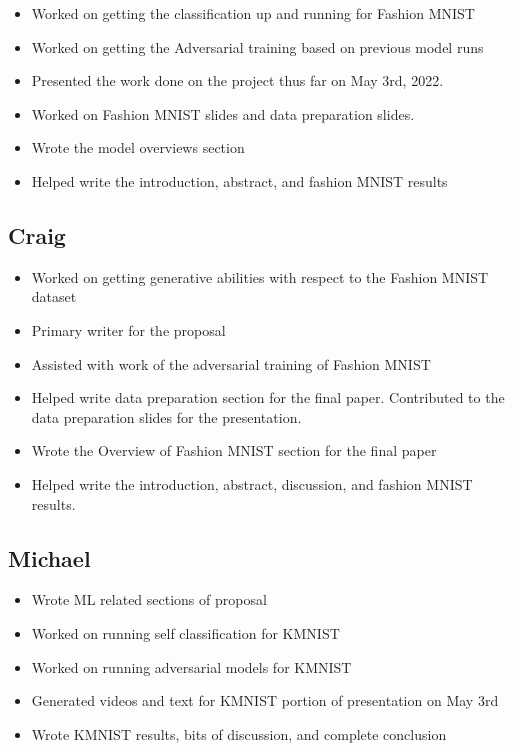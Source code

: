 \documentclass[conference]{IEEEtran}
\begin{document}
\begin{itemize}
    \item Worked on getting the classification up and running for Fashion MNIST
    \item Worked on getting the Adversarial training based on previous model runs
    \item Presented the work done on the project thus far on May 3rd, 2022.
    \item Worked on Fashion MNIST slides and data preparation slides.
    \item Wrote the model overviews section
    \item Helped write the introduction, abstract, and fashion MNIST results
\end{itemize}

\subsection{Craig} 

\begin{itemize}
    \item Worked on getting generative abilities with respect to the Fashion MNIST dataset
    \item Primary writer for the proposal
    \item Assisted with work of the adversarial training of Fashion MNIST
    \item Helped write data preparation section for the final paper. Contributed to the data preparation slides for the presentation.
    \item Wrote the Overview of Fashion MNIST section for the final paper
    \item Helped write the introduction, abstract, discussion, and fashion MNIST results.
\end{itemize}

\subsection{Michael} 

\begin{itemize}
    \item Wrote ML related sections of proposal
    \item Worked on running self classification for KMNIST
    \item Worked on running adversarial models for KMNIST
    \item Generated videos and text for KMNIST portion of presentation on May 3rd
    \item Wrote KMNIST results, bits of discussion, and complete conclusion
\end{itemize}
\end{document}
